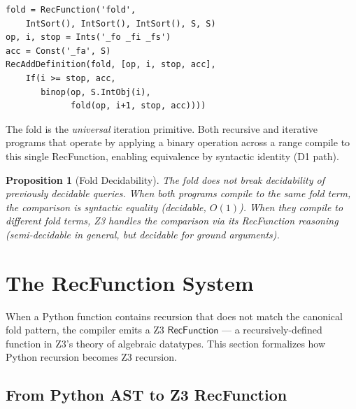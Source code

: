 \documentclass[11pt,a4paper]{report}
\theoremstyle{definition}
\theoremstyle{plain}
\newtheorem{proposition}[definition]{Proposition}
\begin{document}
\begin{lstlisting}[caption={fold: complete Z3 implementation}]
fold = RecFunction('fold',
    IntSort(), IntSort(), IntSort(), S, S)
op, i, stop = Ints('_fo _fi _fs')
acc = Const('_fa', S)
RecAddDefinition(fold, [op, i, stop, acc],
    If(i >= stop, acc,
       binop(op, S.IntObj(i),
             fold(op, i+1, stop, acc))))
\end{lstlisting}

The fold is the \emph{universal} iteration primitive.  Both recursive
and iterative programs that operate by applying a binary operation
across a range compile to this single RecFunction, enabling
equivalence by syntactic identity (D1 path).

\begin{proposition}[Fold Decidability]
\label{prop:fold-decidable}
The fold does not break decidability of previously decidable queries.
When both programs compile to the \emph{same} fold term, the
comparison is syntactic equality (decidable, $O(1)$).  When they
compile to \emph{different} fold terms, Z3 handles the comparison
via its RecFunction reasoning (semi-decidable in general, but
decidable for ground arguments).
\end{proposition}


\section{The RecFunction System}

When a Python function contains recursion that does not match
the canonical fold pattern, the compiler emits a Z3
$\mathsf{RecFunction}$ --- a recursively-defined function in Z3's
theory of algebraic datatypes.  This section formalizes how Python
recursion becomes Z3 recursion.

\subsection{From Python AST to Z3 RecFunction}
\end{document}
